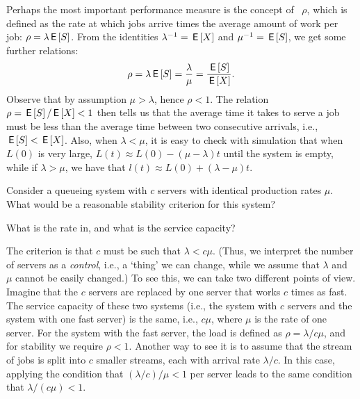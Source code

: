 Perhaps the most important performance measure is the concept of ~$\rho$, which is defined as the rate at which jobs arrive times the average amount of work per job: $\rho = \lambda \,\mathsf{E}\left[S\right]$.
From the identities $\lambda^{-1} = \,\mathsf{E}\left[X\right]$ and $\mu^{-1} = \,\mathsf{E}\left[S\right]$, we get some further relations:
\begin{equation}
 \rho = \lambda \,\mathsf{E}\left[S\right] = \frac{\lambda}{\mu} = \frac{\,\mathsf{E}\left[S\right]}{\,\mathsf{E}\left[X\right]}.
\end{equation}
Observe that by assumption $\mu> \lambda$, hence $\rho < 1$.
The relation $\rho=\,\mathsf{E}\left[S\right]/ \,\mathsf{E}\left[X\right] < 1$ then tells us that the average time it takes to serve a job must be less than the average time between two consecutive arrivals, i.e., $\,\mathsf{E}\left[S\right] < \,\mathsf{E}\left[X\right]$.
Also, when $\lambda < \mu$, it is easy to check with simulation that when $L(0)$ is very large, $L(t) \approx L(0) - (\mu-\lambda)t$ until the system is empty, while if $\lambda>\mu$, we have that $l(t) \approx L(0) + (\lambda-\mu)t$. 


\begin{exercise}
 Consider a queueing system with $c$ servers with identical production rates $\mu$.
 What would be a reasonable stability criterion for this system?
\begin{hint}
What is the rate in, and what is the service capacity?
\end{hint}
\begin{solution}
 The criterion is that $c$ must be such that $\lambda < c\mu$.
 (Thus, we interpret the number of servers as a \emph{control}, i.e., a `thing' we can change, while we assume that $\lambda$ and $\mu$ cannot be easily changed.)
 To see this, we can take two different points of view.
 Imagine that the $c$ servers are replaced by one server that works $c$ times as fast.
 The service capacity of these two systems (i.e., the system with $c$ servers and the system with one fast server) is the same, i.e., $c\mu$, where $\mu$ is the rate of one server.
 For the system with the fast server, the load is defined as $\rho =\lambda/c\mu$, and for stability we require $\rho<1$.
 Another way to see it is to assume that the stream of jobs is split into $c$ smaller streams, each with arrival rate $\lambda/c$.
 In this case, applying the condition that $(\lambda/c )/\mu<1$ per server leads to the same condition that $\lambda/(c\mu) < 1$.
\end{solution}
\end{exercise}


